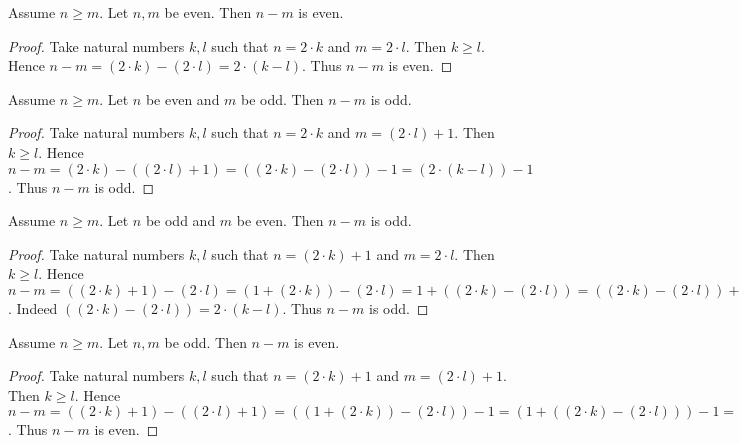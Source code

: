 \documentclass[../../arithmetic.tex]{subfiles}
\begin{document}
  \begin{forthel}
    \begin{proposition}\label{Arithmetic_03_07_575710}
      Assume $n \geq m$.
      Let $n, m$ be even.
      Then $n - m$ is even.
    \end{proposition}
    \begin{proof}
      Take natural numbers $k, l$ such that $n = 2 \cdot k$ and $m = 2 \cdot l$.
      Then $k \geq l$.
      Hence $n - m =
      (2 \cdot k) - (2 \cdot l) =
      2 \cdot (k - l)$.
      Thus $n - m$ is even.
    \end{proof}

    \begin{proposition}\label{Arithmetic_03_07_458980}
      Assume $n \geq m$.
      Let $n$ be even and $m$ be odd.
      Then $n - m$ is odd.
    \end{proposition}
    \begin{proof}
      Take natural numbers $k, l$ such that $n = 2 \cdot k$ and $m = (2 \cdot l) + 1$.
      Then $k \geq l$.
      Hence $n - m =
      (2 \cdot k) - ((2 \cdot l) + 1) =
      ((2 \cdot k) - (2 \cdot l)) - 1 =
      (2 \cdot (k - l)) - 1$.
      Thus $n - m$ is odd.
    \end{proof}

    \begin{corollary}\label{Arithmetic_03_07_728276}
      Assume $n \geq m$.
      Let $n$ be odd and $m$ be even.
      Then $n - m$ is odd.
    \end{corollary}
    \begin{proof}
      Take natural numbers $k, l$ such that $n = (2 \cdot k) + 1$ and $m = 2 \cdot l$.
      Then $k \geq l$.
      Hence $n - m =
      ((2 \cdot k) + 1) - (2 \cdot l) =
      (1 + (2 \cdot k)) - (2 \cdot l) =
      1 + ((2 \cdot k) - (2 \cdot l)) =
      ((2 \cdot k) - (2 \cdot l)) + 1 =
      (2 \cdot (k - l)) + 1$.
      Indeed $((2 \cdot k) - (2 \cdot l)) = 2 \cdot (k - l)$.
      Thus $n - m$ is odd.
    \end{proof}

    \begin{proposition}\label{Arithmetic_03_07_105734}
      Assume $n \geq m$.
      Let $n, m$ be odd.
      Then $n - m$ is even.
    \end{proposition}
    \begin{proof}
      Take natural numbers $k, l$ such that $n = (2 \cdot k) + 1$ and $m = (2 \cdot l) + 1$.
      Then $k \geq l$.
      Hence $n - m =
      ((2 \cdot k) + 1) - ((2 \cdot l) + 1) =
      ((1 + (2 \cdot k)) - (2 \cdot l)) - 1 =
      (1 + ((2 \cdot k) - (2 \cdot l))) - 1 =
      (1 + (2 \cdot (k - l))) - 1 =
      ((2 \cdot (k - l)) + 1) - 1 =
      2 \cdot (k - l)$.
      Thus $n - m$ is even.
    \end{proof}
  \end{forthel}
\end{document}
